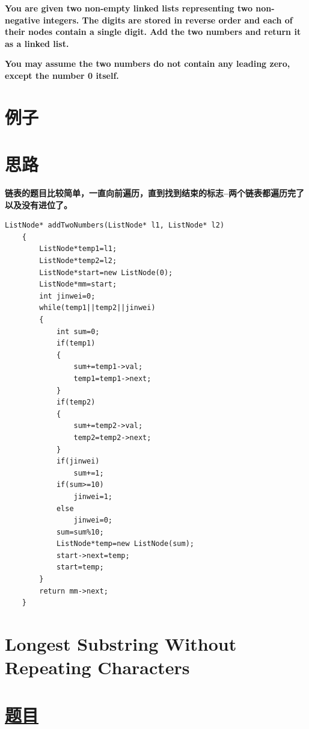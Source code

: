 \documentclass[a4paper, 11pt]{article} %
\begin{document}
\begin{spacing}{1.5}
{{  \textbf{You are given two non-empty linked lists representing two non-negative integers. The digits are stored in reverse order and each of their nodes contain a single digit. Add the two numbers and return it as a linked list.}

  \textbf{You may assume the two numbers do not contain any leading zero, except the number 0 itself.}
  }
  }
  \section*{例子}

\section*{思路}
\textbf{\color{blue}链表的题目比较简单，一直向前遍历，直到找到结束的标志--两个链表都遍历完了以及没有进位了。}
\begin{lstlisting}[caption={},frame=shadowbox]
    ListNode* addTwoNumbers(ListNode* l1, ListNode* l2)
    {
        ListNode*temp1=l1;
        ListNode*temp2=l2;
        ListNode*start=new ListNode(0);
        ListNode*mm=start;
        int jinwei=0;
        while(temp1||temp2||jinwei)
        {
            int sum=0;
            if(temp1)
            {
                sum+=temp1->val;
                temp1=temp1->next;
            }
            if(temp2)
            {
                sum+=temp2->val;
                temp2=temp2->next;
            }
            if(jinwei)
                sum+=1;
            if(sum>=10)
                jinwei=1;
            else
                jinwei=0;
            sum=sum%10;
            ListNode*temp=new ListNode(sum);
            start->next=temp;
            start=temp;
        }
        return mm->next;
    }
\end{lstlisting}

\section{ Longest Substring Without Repeating Characters}
\section*{\href{https://leetcode.com/problems/longest-substring-without-repeating-characters/}{题目}}
\fbox{%
  \parbox{\textwidth}{%

}}
\end{spacing}
\end{document}
